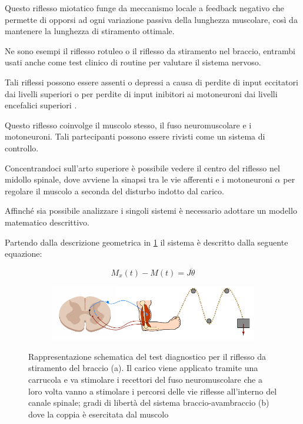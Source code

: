 Questo riflesso miotatico funge da meccanismo locale a feedback negativo che permette di opporsi ad ogni variazione passiva della lunghezza muscolare, così da mantenere la lunghezza di stiramento ottimale. 

Ne sono esempi il riflesso rotuleo o il riflesso da stiramento nel braccio, entrambi usati anche come test clinico di routine per valutare il sistema nervoso. 

Tali riflessi possono essere assenti o depressi a causa di perdite di input eccitatori dai livelli superiori o per perdite di input inibitori ai motoneuroni dai livelli encefalici superiori \cite{sherwood_fisiologia_2008}.

Questo riflesso coinvolge il muscolo stesso, il fuso neuromuscolare e i motoneuroni. Tali partecipanti possono essere rivisti come un sistema di controllo. 

Concentrandoci sull'arto superiore è possibile vedere il centro del riflesso nel midollo spinale, dove avviene la sinapsi tra le vie afferenti e i motoneuroni $\alpha$ per regolare il muscolo a seconda del disturbo indotto dal carico.


Affinché sia possibile analizzare i singoli sistemi è necessario adottare un modello matematico descrittivo.

Partendo dalla descrizione geometrica in \cref{fig:avambraccio} il sistema è descritto dalla seguente equazione:

\begin{equation}
	M_{x}(t)-M(t)=J \ddot{\theta}
\end{equation}



\begin{figure}[t!]
	\centering
	\begin{subfigure}{0.7\linewidth}
		\centering
		\includegraphics[width=0.95\linewidth]{figures/avambraccio_schema}\caption{}
	\end{subfigure}\hfill
	\begin{subfigure}{0.3\linewidth}
		\centering
		\footnotesize{\def\svgwidth{0.9\linewidth}
			}
		\caption{}
	\end{subfigure}
	\caption{Rappresentazione schematica del test diagnostico per il riflesso da stiramento del braccio (a). Il carico viene applicato tramite una carrucola e va stimolare i recettori del fuso neuromuscolare che a loro volta vanno a stimolare i percorsi delle vie riflesse all'interno del canale spinale; gradi di libertà del sistema braccio-avambraccio (b) dove la coppia è esercitata dal muscolo}
	\label{fig:avambraccio}
\end{figure}





